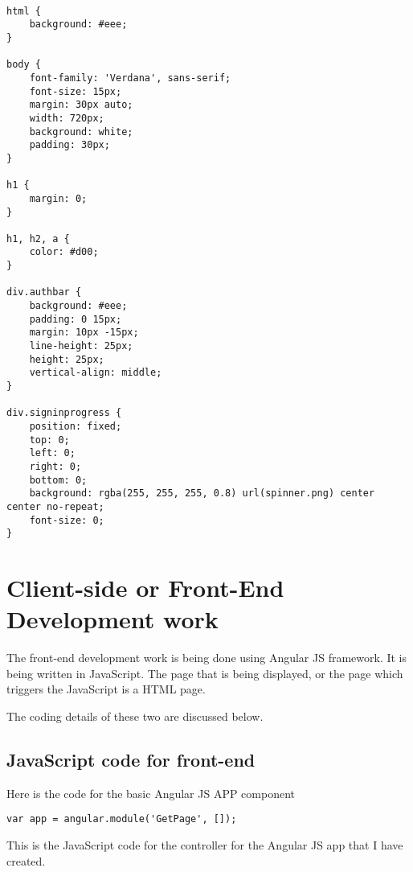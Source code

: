 \documentclass[11pt]{article}
\begin{document}
\begin{verbatim}

html {
    background: #eee;
}

body {
    font-family: 'Verdana', sans-serif;
    font-size: 15px;
    margin: 30px auto;
    width: 720px;
    background: white;
    padding: 30px;
}

h1 {
    margin: 0;
}

h1, h2, a {
    color: #d00;
}

div.authbar {
    background: #eee;
    padding: 0 15px;
    margin: 10px -15px;
    line-height: 25px;
    height: 25px;
    vertical-align: middle;
}

div.signinprogress {
    position: fixed;
    top: 0;
    left: 0;
    right: 0;
    bottom: 0;
    background: rgba(255, 255, 255, 0.8) url(spinner.png) center center no-repeat;
    font-size: 0;
}
\end{verbatim}
\section{Client-side or Front-End Development work}
\label{sec-8}

The front-end development work is being done using Angular JS
framework. It is being written in JavaScript. The page that is being
displayed, or the page which triggers the JavaScript is a HTML page.

The coding details of these two are discussed below.
\subsection{JavaScript code for front-end}
\label{sec-8-1}

Here is the code for the basic Angular JS APP component

\begin{verbatim}
var app = angular.module('GetPage', []);
\end{verbatim}

This is the JavaScript code for the controller for the Angular JS app that I have created.
\end{document}
